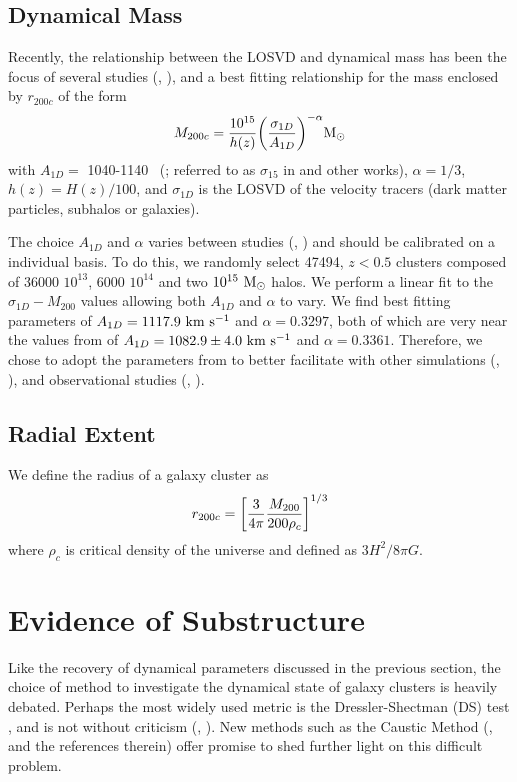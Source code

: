 \documentclass[apj, revtex4]{emulateapj}
\newcommand{\citeeg}[1]{(\eg, \citealt{#1})}
\begin{document}
\subsection{Dynamical Mass}\label{sec:mass}
Recently, the relationship between the LOSVD and dynamical mass has been the focus of several studies \citeeg{Evrard2008, Saro2013, Sifon2013, VanderBurg2014}, and a best fitting relationship for the mass enclosed by $r_{200c}$ of the form
\begin{equation}
	M_{200c} = \frac{10^{15}}{h(z)} \bigg{(}\frac{\sigma_{1D}}{A_{1D}} \bigg{)}^{-\alpha} \hbox{$\mathrm{M}_\odot$}
\end{equation}
with $A_{1D} =$ 1040-1140 \kms\ (\citealt{Munari2013}; referred to as $\sigma_{15}$ in \citealt{Evrard2008} and other works), $\alpha = 1/3$, $h(z) = H(z)/100$, and $\sigma_{1D}$ is the LOSVD of the velocity tracers (dark matter particles, subhalos or galaxies).

The choice $A_{1D}$ and $\alpha$ varies between studies \citeeg{Munari2013, VanderBurg2014} and should be calibrated on a individual basis. To do this, we randomly select 47494, $z<0.5$ clusters composed of 36000 $10^{13}$, 6000 $10^{14}$ and two $10^{15}~\hbox{$\mathrm{M}_\odot$}$ halos. We perform a linear fit to the $\sigma_{1D}-M_{200}$ values allowing both $A_{1D}$ and $\alpha$ to vary. We find best fitting parameters of $A_{1D} = 1117.9~\hbox{km~s$^{-1}$}$ and $\alpha = 0.3297$, both of which are very near the values from \cite{Evrard2008} of $A_{1D} = 1082.9 \pm 4.0~\hbox{km~s$^{-1}$}$ and $\alpha = 0.3361$. Therefore, we chose to adopt the parameters from \cite{Evrard2008} to better facilitate with other simulations \citeeg{Old2014}, and observational studies \citeeg{Brodwin2010}.

\subsection{Radial Extent}
We define the radius of a galaxy cluster as
\begin{equation}
	r_{200c} = \bigg{[} \frac{3}{4\pi} \frac{M_{200}}{200\rho_c} \bigg{]}^{1/3}
\end{equation}
where $\rho_c$ is critical density of the universe and defined as $3H^2/8\pi G$.


\section{Evidence of Substructure}
Like the recovery of dynamical parameters discussed in the previous section, the choice of method to investigate the dynamical state of galaxy clusters is heavily debated. Perhaps the most widely used metric is the Dressler-Shectman (DS) test \citep{Dressler1988}, and is not without criticism \citeeg{White2010}. New methods such as the Caustic Method (\citealt{Yu2015}, and the references therein) offer promise to shed further light on this difficult problem.
\end{document}
